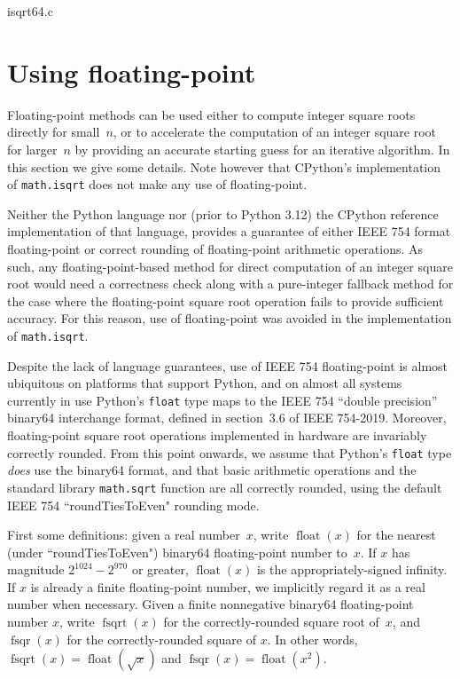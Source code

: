 \documentclass[a4paper]{article}
\DeclareMathOperator{\fsqrt}{fsqrt}
\DeclareMathOperator{\fsqr}{fsqr}
\DeclareMathOperator{\float}{float}
\theoremstyle{plain}
\theoremstyle{definition}
\begin{document}

  {isqrt64.c}

\section{Using floating-point}

Floating-point methods can be used either to compute integer square roots
directly for small~$n$, or to accelerate the computation of an integer square
root for larger~$n$ by providing an accurate starting guess for an iterative
algorithm. In this section we give some details. Note however that CPython's
implementation of \lstinline{math.isqrt} does not make any use of
floating-point.

Neither the Python language nor (prior to Python 3.12) the CPython
reference implementation of that language, provides a guarantee of either IEEE
754 format floating-point or correct rounding of floating-point arithmetic
operations. As such, any floating-point-based method for direct computation of
an integer square root would need a correctness check along with a pure-integer
fallback method for the case where the floating-point square root operation
fails to provide sufficient accuracy. For this reason, use of floating-point
was avoided in the implementation of \lstinline{math.isqrt}.

Despite the lack of language guarantees, use of IEEE 754 floating-point is
almost ubiquitous on platforms that support Python, and on almost all systems
currently in use Python's \lstinline{float} type maps to the IEEE 754 ``double
precision'' binary64 interchange format, defined in section~3.6 of IEEE
754-2019. Moreover, floating-point square root operations implemented in
hardware are invariably correctly rounded. From this point onwards, we assume
that Python's \lstinline{float} type \emph{does} use the binary64 format, and
that basic arithmetic operations and the standard library \lstinline{math.sqrt}
function are all correctly rounded, using the default IEEE 754
``roundTiesToEven" rounding mode.

First some definitions: given a real number~$x$, write $\float(x)$ for the
nearest (under ``roundTiesToEven") binary64 floating-point number to~$x$. If
$x$ has magnitude $2^{1024} - 2^{970}$ or greater, $\float(x)$ is the
appropriately-signed infinity. If $x$ is already a finite floating-point
number, we implicitly regard it as a real number when necessary. Given a finite
nonnegative binary64 floating-point number $x$, write $\fsqrt(x)$ for the
correctly-rounded square root of~$x$, and $\fsqr(x)$ for the correctly-rounded
square of $x$. In other words, $\fsqrt(x) = \float(\sqrt x)$ and $\fsqr(x) =
\float(x^2)$.
\end{document}
